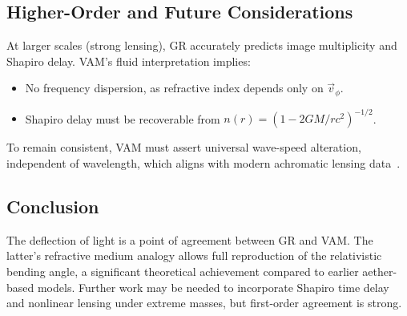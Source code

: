 \subsection*{Higher-Order and Future Considerations}
At larger scales (strong lensing), GR accurately predicts image multiplicity and Shapiro delay. VAM’s fluid interpretation implies:
\begin{itemize}
    \item No frequency dispersion, as refractive index depends only on $\vec{v}_\phi$.
    \item Shapiro delay must be recoverable from $n(r) = (1 - 2GM/rc^2)^{-1/2}$.
\end{itemize}
To remain consistent, VAM must assert universal wave-speed alteration, independent of wavelength, which aligns with modern achromatic lensing data~\cite{eubanks1997vla,shapiro2004gravitational}.

\subsection*{Conclusion}
The deflection of light is a point of agreement between GR and VAM. The latter’s refractive medium analogy allows full reproduction of the relativistic bending angle, a significant theoretical achievement compared to earlier aether-based models. Further work may be needed to incorporate Shapiro time delay and nonlinear lensing under extreme masses, but first-order agreement is strong.
